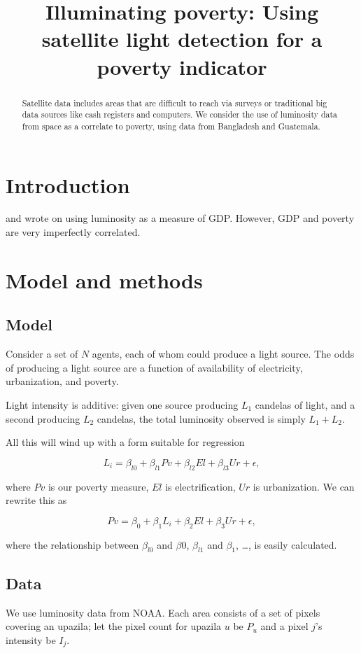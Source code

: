 \documentclass{article}
\begin{document}
\title{Illuminating poverty: Using satellite light detection for a poverty indicator}
\maketitle
\begin{abstract}
Satellite data includes areas that are difficult to reach via surveys or traditional big
data sources like cash registers and computers. We consider the use of luminosity data
from space as a correlate to poverty, using data from Bangladesh and Guatemala.
\end{abstract}

\section{Introduction}

\citet{chen:pnas} and \citet{henderson:nber} wrote on using luminosity as a measure of GDP. However, GDP and poverty are very imperfectly correlated.

\section{Model and methods}

\subsection{Model}
Consider a set of $N$ agents, each of whom could produce a light source. The odds of
producing a light source are a function of availability of electricity, urbanization, and poverty.

Light intensity is additive: given one source producing $L_1$ candelas of light, and a
second producing $L_2$ candelas, the total luminosity observed is simply $L_1+L_2$.

All this will wind up with a form suitable for regression 

$$L_i = \beta_{l0} + \beta_{l1} Pv + \beta_{l2} El + \beta_{l3} Ur + \epsilon,$$

where $Pv$ is our poverty measure, $El$ is electrification, $Ur$ is urbanization.
We can rewrite this as 

$$Pv = \beta_0 + \beta_1 L_i  + \beta_2 El + \beta_3 Ur + \epsilon,$$

where the relationship between $\beta_{l0}$ and $\beta{0}$, $\beta_{l1}$ and $\beta_1$, \dots, is easily calculated.

\subsection{Data}
We use luminosity data from NOAA. 
Each area consists of a set of pixels covering an upazila; let the pixel count for upazila
$u$ be $P_u$ and a pixel $j$'s intensity be $I_j$.
\end{document}
